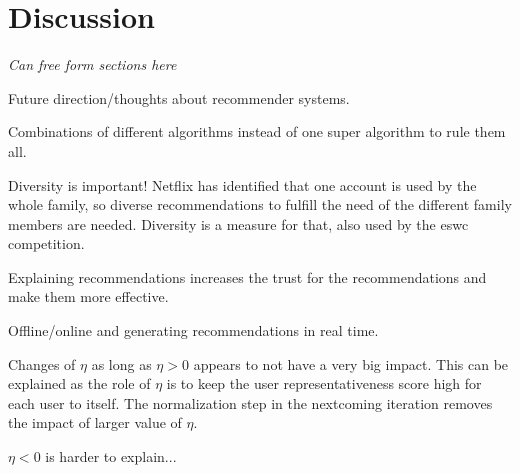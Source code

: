 \chapter{Discussion}\label{cha:discussion}

\textit{Can free form sections here}




Future direction/thoughts about recommender systems.

Combinations of different algorithms instead of one super algorithm to rule them all.

Diversity is important! Netflix has identified that one account is used by the whole family, so diverse recommendations to fulfill the need of the different family members are needed. Diversity is a measure for that, also used by the eswc competition.

Explaining recommendations increases the trust for the recommendations and make them more effective.

Offline/online and generating recommendations in real time.

Changes of $\eta$ as long as $\eta > 0$ appears to not have a very big impact. This can be explained as the role of $\eta$ is to keep the user representativeness score high for each user to itself. The normalization step in the nextcoming iteration removes the impact of larger value of $\eta$.

$\eta < 0 $ is harder to explain...

